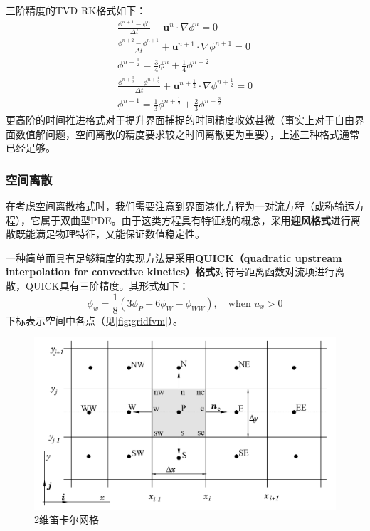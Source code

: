 \documentclass[11pt]{article}
\begin{document}
三阶精度的TVD RK格式如下：
\begin{eqnarray}
    \frac{\phi^{n+1}-\phi^n}{\Delta t}+\bm{u}^n\cdot\nabla\phi^n=0 \\
    \frac{\phi^{n+2}-\phi^{n+1}}{\Delta t}+\bm{u}^{n+1}\cdot\nabla\phi^{n+1}=0 \\
    \phi^{n+\frac{1}{2}}=\frac{3}{4}\phi^n+\frac{1}{4}\phi^{n+2} \\
    \frac{\phi^{n+\frac{3}{2}}-\phi^{n+\frac{1}{2}}}{\Delta t}+\bm{u}^{n+\frac{1}{2}}\cdot\nabla\phi^{n+\frac{1}{2}}=0 \\
    \phi^{n+1}=\frac{1}{3}\phi^{n+\frac{1}{2}}+\frac{2}{3}\phi^{n+\frac{3}{2}}
\end{eqnarray}
更高阶的时间推进格式对于提升界面捕捉的时间精度收效甚微（事实上对于自由界面数值解问题，空间离散的精度要求较之时间离散更为重要\citep{osher_level_2003}），上述三种格式通常已经足够。

\subsubsection{空间离散}
在考虑空间离散格式时，我们需要注意到界面演化方程为一对流方程（或称输运方程），它属于双曲型PDE。由于这类方程具有特征线的概念，采用\textbf{迎风格式}进行离散既能满足物理特征，又能保证数值稳定性。

一种简单而具有足够精度的实现方法是采用\textbf{QUICK（quadratic upstream interpolation for convective kinetics）格式}对符号距离函数对流项进行离散，QUICK具有三阶精度。其形式如下：
\begin{equation}
    \phi_w=\frac{1}{8}\left(3\phi_P+6\phi_{W}-\phi_{WW}\right),\quad \text{when }u_x>0
\end{equation}
下标表示空间中各点（见\autoref{fig:gridfvm}）。

\begin{figure}[htbp]
    \centering
    \includegraphics[width=0.6\linewidth]{figure/gridfvm.png}
    \caption{\label{fig:gridfvm}2维笛卡尔网格\citep{ferziger_computational_2020}}
\end{figure}
\end{document}
